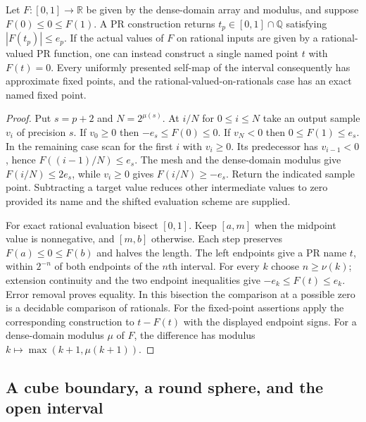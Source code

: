 \begin{theorem}\label{idx-metric314}
Let $F:[0,1]\to\mathbb R$ be given by the dense-domain array and modulus,
and suppose $F(0)\le0\le F(1)$. A PR construction returns $t_p\in[0,1]
\cap\mathbb Q$ satisfying $|F(t_p)|\le e_p$. If the actual values of $F$
on rational inputs are given by a rational-valued PR function, one can
instead construct a single named point $t$ with $F(t)=0$.
Every uniformly presented self-map of the interval consequently has
approximate fixed points, and the rational-valued-on-rationals case has
an exact named fixed point.
\end{theorem}
\begin{proof}
Put $s=p+2$ and $N=2^{\mu(s)}$. At $i/N$ for $0\le i\le N$
take an output sample $v_i$ of precision $s$. If $v_0\ge0$ then
$-e_s\le F(0)\le0$. If $v_N<0$ then $0\le F(1)\le e_s$.
In the remaining case scan for the first $i$ with $v_i\ge0$.
Its predecessor has $v_{i-1}<0$, hence $F((i-1)/N)\le e_s$.
The mesh and the dense-domain modulus give $F(i/N)\le 2e_s$,
while $v_i\ge0$ gives $F(i/N)\ge-e_s$. Return the indicated sample
point. Subtracting a target value reduces other intermediate values to zero
provided its name and the shifted evaluation scheme are supplied.

For exact rational evaluation bisect $[0,1]$. Keep $[a,m]$ when the
midpoint value is nonnegative, and $[m,b]$ otherwise. Each step preserves
$F(a)\le0\le F(b)$ and halves the length. The left endpoints give a PR name
$t$, within $2^{-n}$ of both endpoints of the $n$th interval. For every
$k$ choose $n\ge\nu(k)$; extension continuity and the two endpoint
inequalities give $-e_k\le F(t)\le e_k$. Error removal proves equality.
In this bisection the comparison at a possible zero is a decidable
comparison of rationals. For the fixed-point assertions apply the
corresponding construction to $t-F(t)$ with the displayed endpoint signs.
For a dense-domain modulus $\mu$ of $F$, the difference has modulus
$k\mapsto\max(k+1,\mu(k+1))$.
\end{proof}

\subsection{A cube boundary, a round sphere, and the open interval}

